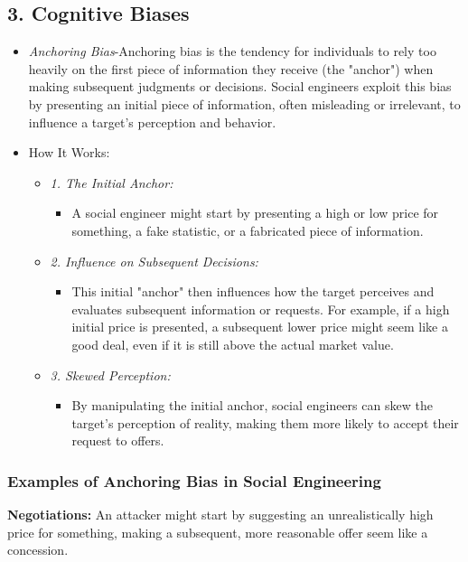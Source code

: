 \subsection{3. Cognitive Biases}
\begin{itemize}
    \item \textit{Anchoring Bias}-Anchoring bias is the tendency for individuals to rely too heavily on the first piece of information they receive (the "anchor") when making subsequent judgments or decisions. Social engineers exploit this bias by presenting an initial piece of information, often misleading or irrelevant, to influence a target's perception and behavior.
    \item How It Works:
    \begin{itemize}
        \item \textit{1. The Initial Anchor:}
        \begin{itemize}
            \item A social engineer might start by presenting a high or low price for something, a fake statistic, or a fabricated piece of information.
        \end{itemize}
    \item \textit{2. Influence on Subsequent Decisions:}
    \begin{itemize}
        \item This initial "anchor" then influences how the target perceives and evaluates subsequent information or requests. For example, if a high initial price is presented, a subsequent lower price might seem like a good deal, even if it is still above the actual market value.
    \end{itemize}
    \item \textit{3. Skewed Perception:}
    \begin{itemize}
        \item By manipulating the initial anchor, social engineers can skew the target's perception of reality, making them more likely to accept their request to offers.
    \end{itemize}
    \end{itemize}
        \end{itemize}

\subsubsection{Examples of Anchoring Bias in Social Engineering}
\textbf{Negotiations:}
An attacker might start by suggesting an unrealistically high price for something, making a subsequent, more reasonable offer seem like a concession.

